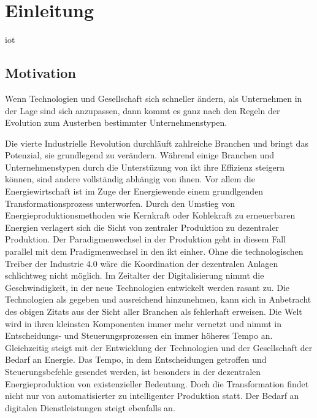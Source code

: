 \section{Einleitung}

\ac{iot}

\subsection{Motivation}

\begin{displayquote}
  \glqq Wenn Technologien und Gesellschaft sich schneller ändern, als Unternehmen in der Lage sind sich anzupassen, dann kommt es ganz nach den Regeln der Evolution zum Austerben bestimmter Unternehmenstypen.\grqq{}
\end{displayquote}

\begin{flushright}
  \citet[S. 3, zitiert nach Land, K.-H. 2015]{Roth2016}
\end{flushright}

\noindent Die vierte Industrielle Revolution durchläuft zahlreiche Branchen und bringt das Potenzial, sie grundlegend zu verändern. Während einige Branchen und Unternehmenstypen durch die Unterstüzung von \ac{ikt} ihre Effizienz steigern können, sind andere vollständig abhängig von ihnen. Vor allem die Energiewirtschaft ist im Zuge der Energiewende einem grundlgenden Transformationsprozess unterworfen. Durch den Umstieg von Energieproduktionsmethoden wie Kernkraft oder Kohlekraft zu erneuerbaren Energien verlagert sich die Sicht von zentraler Produktion zu dezentraler Produktion. Der Paradigmenwechsel in der Produktion geht in diesem Fall parallel mit dem Pradigmenwechsel in den \ac{ikt} einher. Ohne die technologischen Treiber der Industrie 4.0 wäre die Koordination der dezentralen Anlagen schlichtweg nicht möglich. Im Zeitalter der Digitalisierung nimmt die Geschwindigkeit, in der neue Technologien entwickelt werden rasant zu. Die Technologien als gegeben und ausreichend hinzunehmen, kann sich in Anbetracht des obigen Zitats aus der Sicht aller Branchen als fehlerhaft erweisen. Die Welt wird in ihren kleinsten Komponenten immer mehr vernetzt und nimmt in Entscheidungs- und Steuerungsprozessen ein immer höheres Tempo an. Gleichzeitig steigt mit der Entwicklung der Technologien und der Gesellschaft der Bedarf an Energie. Das Tempo, in dem Entscheidungen getroffen und Steuerungsbefehle gesendet werden, ist besonders in der dezentralen Energieproduktion von existenzieller Bedeutung. Doch die Transformation findet nicht nur von automatisierter zu intelligenter Produktion statt. Der Bedarf an digitalen Dienstleistungen steigt ebenfalls an.  

